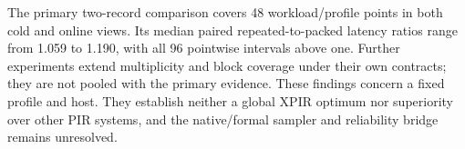 The primary two-record comparison covers 48 workload/profile points in
both cold and online views. Its median paired repeated-to-packed latency
ratios range from 1.059 to 1.190, with all 96 pointwise intervals above
one. Further experiments extend multiplicity and block coverage under
their own contracts; they are not pooled with the primary evidence.
These findings concern a fixed profile and host. They establish neither
a global XPIR optimum nor superiority over other PIR systems, and the
native/formal sampler and reliability bridge remains unresolved.
